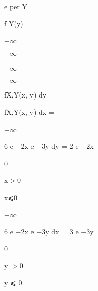 \documentclass[a4paper,portrait,12pt]{article}
\begin{document}
\begin{flushleft}
e per Y
\end{flushleft}


\begin{flushleft}
f Y(y) =
\end{flushleft}





+$\infty$


$-$$\infty$





+$\infty$


$-$$\infty$





\begin{flushleft}
fX,Y(x, y) dy =
\end{flushleft}


\begin{flushleft}
fX,Y(x, y) dx =
\end{flushleft}





+$\infty$


\begin{flushleft}
6 e $-$2x e $-$3y dy = 2 e $-$2x
\end{flushleft}


0





\begin{flushleft}
x$>$0
\end{flushleft}


\begin{flushleft}
x⩽0
\end{flushleft}





+$\infty$


\begin{flushleft}
6 e $-$2x e $-$3y dx = 3 e $-$3y
\end{flushleft}


0





\begin{flushleft}
y $>$0
\end{flushleft}


\begin{flushleft}
y ⩽ 0.
\end{flushleft}
\end{document}

